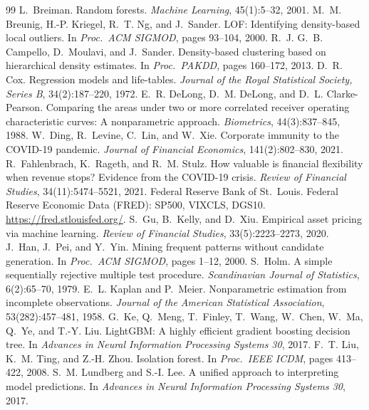 \documentclass[11pt]{article}
\begin{document}
\begin{thebibliography}{99}
\small
{} L.~Breiman. Random forests. \emph{Machine Learning}, 45(1):5--32, 2001.
 M.~M. Breunig, H.-P. Kriegel, R.~T. Ng, and J.~Sander. LOF: Identifying density-based local outliers. In \emph{Proc.\ ACM SIGMOD}, pages 93--104, 2000.
 R.~J. G.~B. Campello, D.~Moulavi, and J.~Sander. Density-based clustering based on hierarchical density estimates. In \emph{Proc.\ PAKDD}, pages 160--172, 2013.
 D.~R. Cox. Regression models and life-tables. \emph{Journal of the Royal Statistical Society, Series B}, 34(2):187--220, 1972.
 E.~R. DeLong, D.~M. DeLong, and D.~L. Clarke-Pearson. Comparing the areas under two or more correlated receiver operating characteristic curves: A nonparametric approach. \emph{Biometrics}, 44(3):837--845, 1988.
 W.~Ding, R.~Levine, C.~Lin, and W.~Xie. Corporate immunity to the COVID-19 pandemic. \emph{Journal of Financial Economics}, 141(2):802--830, 2021.
 R.~Fahlenbrach, K.~Rageth, and R.~M. Stulz. How valuable is financial flexibility when revenue stops? Evidence from the COVID-19 crisis. \emph{Review of Financial Studies}, 34(11):5474--5521, 2021.
 Federal Reserve Bank of St.~Louis. Federal Reserve Economic Data (FRED): SP500, VIXCLS, DGS10. \url{https://fred.stlouisfed.org/}.
 S.~Gu, B.~Kelly, and D.~Xiu. Empirical asset pricing via machine learning. \emph{Review of Financial Studies}, 33(5):2223--2273, 2020.
 J.~Han, J.~Pei, and Y.~Yin. Mining frequent patterns without candidate generation. In \emph{Proc.\ ACM SIGMOD}, pages 1--12, 2000.
 S.~Holm. A simple sequentially rejective multiple test procedure. \emph{Scandinavian Journal of Statistics}, 6(2):65--70, 1979.
 E.~L. Kaplan and P.~Meier. Nonparametric estimation from incomplete observations. \emph{Journal of the American Statistical Association}, 53(282):457--481, 1958.
 G.~Ke, Q.~Meng, T.~Finley, T.~Wang, W.~Chen, W.~Ma, Q.~Ye, and T.-Y. Liu. LightGBM: A highly efficient gradient boosting decision tree. In \emph{Advances in Neural Information Processing Systems 30}, 2017.
 F.~T. Liu, K.~M. Ting, and Z.-H. Zhou. Isolation forest. In \emph{Proc.\ IEEE ICDM}, pages 413--422, 2008.
 S.~M. Lundberg and S.-I. Lee. A unified approach to interpreting model predictions. In \emph{Advances in Neural Information Processing Systems 30}, 2017.

\end{thebibliography}
\end{document}
